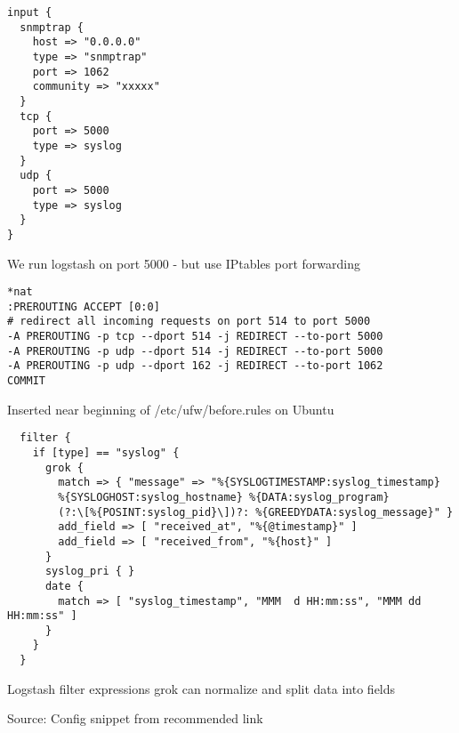 \documentclass[20pt,landscape,a4paper,footrule]{foils}
\begin{document}

{\footnotesize
\begin{verbatim}
input {
  snmptrap {
    host => "0.0.0.0"
    type => "snmptrap"
    port => 1062
    community => "xxxxx"
  }
  tcp {
    port => 5000
    type => syslog
  }
  udp {
    port => 5000
    type => syslog
  }
}
\end{verbatim}
}

\begin{list2}
\item We run logstash on port 5000 - but use IPtables port forwarding
\end{list2}


{\footnotesize
\begin{verbatim}
*nat
:PREROUTING ACCEPT [0:0]
# redirect all incoming requests on port 514 to port 5000
-A PREROUTING -p tcp --dport 514 -j REDIRECT --to-port 5000
-A PREROUTING -p udp --dport 514 -j REDIRECT --to-port 5000
-A PREROUTING -p udp --dport 162 -j REDIRECT --to-port 1062
COMMIT
\end{verbatim}
}

\centerline{Inserted near beginning of /etc/ufw/before.rules on Ubuntu}


{\footnotesize
\begin{verbatim}
  filter {
    if [type] == "syslog" {
      grok {
        match => { "message" => "%{SYSLOGTIMESTAMP:syslog_timestamp}
        %{SYSLOGHOST:syslog_hostname} %{DATA:syslog_program}
        (?:\[%{POSINT:syslog_pid}\])?: %{GREEDYDATA:syslog_message}" }
        add_field => [ "received_at", "%{@timestamp}" ]
        add_field => [ "received_from", "%{host}" ]
      }
      syslog_pri { }
      date {
        match => [ "syslog_timestamp", "MMM  d HH:mm:ss", "MMM dd HH:mm:ss" ]
      }
    }
  }
\end{verbatim}
}

\begin{list2}
\item Logstash filter expressions grok can normalize and split data into fields
\end{list2}

Source:
Config snippet from recommended link\\
{\small{}}


\end{document}
